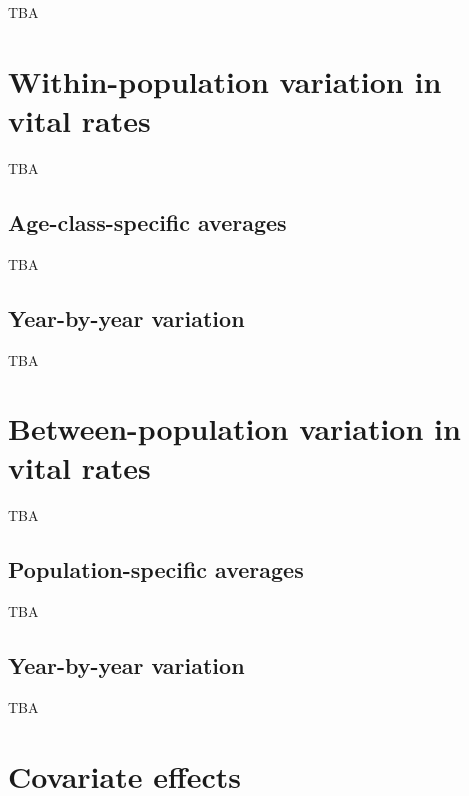 \documentclass[
]{book}
\begin{document}
TBA

\hypertarget{within-population-variation-in-vital-rates}{%
\section{Within-population variation in vital rates}\label{within-population-variation-in-vital-rates}}

TBA

\hypertarget{age-class-specific-averages}{%
\subsection{Age-class-specific averages}\label{age-class-specific-averages}}

TBA

\hypertarget{year-by-year-variation}{%
\subsection{Year-by-year variation}\label{year-by-year-variation}}

TBA

\hypertarget{between-population-variation-in-vital-rates}{%
\section{Between-population variation in vital rates}\label{between-population-variation-in-vital-rates}}

TBA

\hypertarget{population-specific-averages}{%
\subsection{Population-specific averages}\label{population-specific-averages}}

TBA

\hypertarget{year-by-year-variation-1}{%
\subsection{Year-by-year variation}\label{year-by-year-variation-1}}

TBA

\hypertarget{covariate-effects}{%
\section{Covariate effects}\label{covariate-effects}}
\end{document}
